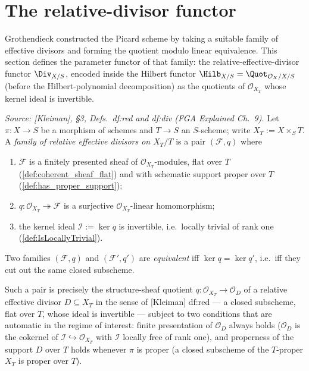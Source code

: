 \section{The relative-divisor functor}
\label{sec:div_functor}

Grothendieck constructed the Picard scheme by taking a suitable family of
effective divisors and forming the quotient modulo linear equivalence.  This
section defines the parameter functor of that family: the
relative-effective-divisor functor \(\Div_{X/S}\), encoded inside the Hilbert
functor \(\Hilb_{X/S} = \Quot_{\mathcal O_X/X/S}\) (before the
Hilbert-polynomial decomposition) as the quotients of
\(\mathcal O_{X_T}\) whose kernel ideal is invertible.

\begin{definition}
  \label{def:div_family}
  \textit{Source: [Kleiman], \S 3, Defs.~df:red and df:div (FGA Explained
  Ch.~9).}
  Let \(\pi : X \to S\) be a morphism of schemes and \(T \to S\) an
  \(S\)-scheme; write \(X_T := X \times_S T\).  A \emph{family of relative
  effective divisors on \(X_T/T\)} is a pair \((\mathcal F, q)\) where
  \begin{enumerate}
    \item \(\mathcal F\) is a finitely presented sheaf of
      \(\mathcal O_{X_T}\)-modules, flat over \(T\)
      (\cref{def:coherent_sheaf_flat}) and with schematic support proper
      over \(T\) (\cref{def:has_proper_support});
    \item \(q : \mathcal O_{X_T} \twoheadrightarrow \mathcal F\) is a
      surjective \(\mathcal O_{X_T}\)-linear homomorphism;
    \item the kernel ideal \(\mathcal I := \ker q\) is invertible, i.e.\
      locally trivial of rank one (\cref{def:IsLocallyTrivial}).
  \end{enumerate}
  Two families \((\mathcal F, q)\) and \((\mathcal F', q')\) are
  \emph{equivalent} iff \(\ker q = \ker q'\), i.e.\ iff they cut out the same
  closed subscheme.

  Such a pair is precisely the structure-sheaf quotient
  \(q : \mathcal O_{X_T} \to \mathcal O_D\) of a relative effective divisor
  \(D \subseteq X_T\) in the sense of [Kleiman] df:red --- a closed
  subscheme, flat over \(T\), whose ideal is invertible --- subject to two
  conditions that are automatic in the regime of interest: finite
  presentation of \(\mathcal O_D\) always holds (\(\mathcal O_D\) is the
  cokernel of \(\mathcal I \hookrightarrow \mathcal O_{X_T}\) with
  \(\mathcal I\) locally free of rank one), and properness of the support
  \(D\) over \(T\) holds whenever \(\pi\) is proper (a closed subscheme of
  the \(T\)-proper \(X_T\) is proper over \(T\)).
\end{definition}

